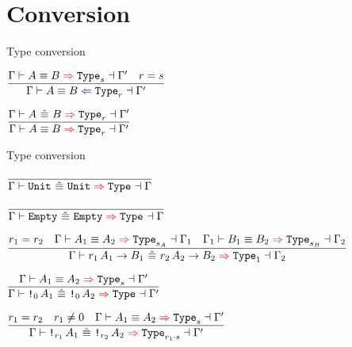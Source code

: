 \section{Conversion}

\begin{frame}{Type conversion}

\begin{center}
  $\infrule{\infertypeconv{\Gamma}{A}{B}[s]{\Gamma'} \quad r = s}{\checktypeconv{\Gamma}{A}{B}[r]{\Gamma'}}$

  \vspace{2em}

  $\infrule{\infertypeconvwhnf{\Gamma}{A}{B}[r]{\Gamma'}}{\infertypeconv{\Gamma}{A}{B}[r]{\Gamma'}}$
\end{center}

\end{frame}

\begin{frame}{Type conversion}

\begin{center}
  $\infrule{}{\infertypeconvwhnf{\Gamma}{\Unit}{\Unit}{\Gamma}}$

  \vspace{1em}

  $\infrule{}{\infertypeconvwhnf{\Gamma}{\Empty}{\Empty}{\Gamma}}$

  \vspace{2em}

  $\infrule{r_1 = r_2 \quad \infertypeconv{\Gamma}{A_1}{A_2}[s_A]{\Gamma_1} \quad \infertypeconv{\Gamma_1}{B_1}{B_2}[s_B]{\Gamma_2}}{\infertypeconvwhnf{\Gamma}{\Fun[r_1]{A_1}{B_1}}{\Fun[r_2]{A_2}{B_2}}[\One]{\Gamma_2}}$

  \vspace{2em}

  $\infrule{\infertypeconv{\Gamma}{A_1}{A_2}[s]{\Gamma'}}{\infertypeconvwhnf{\Gamma}{\Box[\Zero]{A_1}}{\Box[\Zero]{A_2}}{\Gamma'}}$

  \vspace{1em}

  $\infrule{r_1 = r_2 \quad r_1 \neq \Zero \quad \infertypeconv{\Gamma}{A_1}{A_2}[s]{\Gamma'}}{\infertypeconvwhnf{\Gamma}{\Box[r_1]{A_1}}{\Box[r_2]{A_2}}[\mulqty{r_1}{s}]{\Gamma'}}$
\end{center}

\end{frame}

